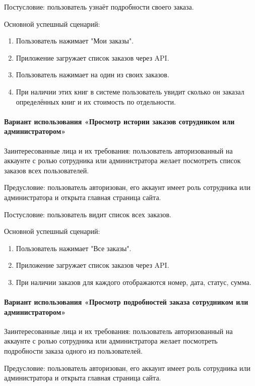Постусловие: пользователь узнаёт подробности своего заказа.

Основной успешный сценарий:

\begin{enumerate}
	\item Пользователь нажимает "Мои заказы".
	\item Приложение загружает список заказов через API.
	\item Пользователь нажимает на один из своих заказов.
	\item При наличии этих книг в системе пользователь увидит сколько он заказал определённых книг и их стоимость по отдельности.
\end{enumerate}


\paragraph{Вариант использования «Просмотр истории заказов сотрудником или администратором»}

Заинтересованные лица и их требования: пользователь авторизованный на аккаунте с ролью сотрудника или администратора желает посмотреть список заказов всех пользователей.

Предусловие: пользователь авторизован, его аккаунт имеет роль сотрудника или администратора и открыта главная страница сайта.

Постусловие: пользователь видит список всех заказов.

Основной успешный сценарий:

\begin{enumerate}
	\item Пользователь нажимает "Все заказы".
	\item Приложение загружает список заказов через API.
	\item При наличии заказов для каждого отображаются номер, дата, статус, сумма.
\end{enumerate}


\paragraph{Вариант использования «Просмотр подробностей заказа сотрудником или администратором»}

Заинтересованные лица и их требования: пользователь авторизованный на аккаунте с ролью сотрудника или администратора желает посмотреть подробности заказа одного из пользователей.

Предусловие: пользователь авторизован, его аккаунт имеет роль сотрудника или администратора и открыта главная страница сайта.

